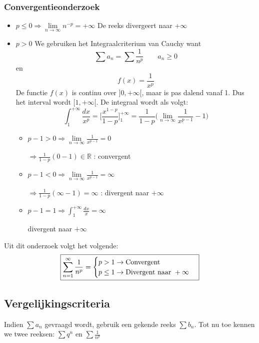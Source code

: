 \subsubsection{Convergentieonderzoek}
\begin{itemize}
	\item $p \leq 0 \Rightarrow \lim\limits_{n\to\infty} n^{-p} = +\infty$
	      De reeks divergeert naar $+\infty$
	\item $p > 0$
	      We gebruiken het Integraalcriterium van Cauchy want
	      $$\sum a_n = \sum \frac{1}{n^p} \qquad a_n \geq 0$$
	      en
	      $$f(x) = \frac{1}{x^p}$$
	      De functie $f(x)$ is continu over $]0, +\infty[$, maar is pas dalend vanaf 1. Dus het interval wordt $[1, +\infty[$. De integraal wordt als volgt:
	      $$\int_{1}^{+\infty} \frac{dx}{x^p} = \bigg[\frac{x^{1 - p}}{1 - p}\bigg]_1^{+\infty} = \frac{1}{1 - p}\bigg(\lim\limits_{n\to\infty}\frac{1}{x^{p-1}} - 1\bigg)$$
	      \begin{itemize}[label={als}]
		      \item $p - 1 > 0 \Rightarrow \lim\limits_{n\to\infty}\frac{1}{x^{p-1}} = 0$

		            $\Rightarrow \frac{1}{1 - p}(0 - 1) \in \mathbb{R}$ : convergent

		      \item $p - 1 < 0 \Rightarrow \lim\limits_{n\to\infty}\frac{1}{x^{p-1}} = \infty$

		            $\Rightarrow \frac{1}{1 - p}(\infty - 1) = \infty$ : divergent naar $+\infty$

		      \item $p - 1 = 1 \Rightarrow \int_1^{+\infty} \frac{dx}{x} = \infty$

		            divergent naar $+\infty$
	      \end{itemize}

\end{itemize}
Uit dit onderzoek volgt het volgende:
$$
	\boxed{
		\sum_{n = 1}^{\infty} \frac{1}{n^p} = \begin{cases}
			p > 1 \rightarrow \hbox{Convergent}                 \\
			p \leq 1 \rightarrow \hbox{Divergent naar } +\infty \\
		\end{cases}
	}
$$
\subsection{Vergelijkingscriteria}
Indien $\sum a_n$ gevraagd wordt, gebruik een gekende reeks $\sum b_n$. Tot nu toe kennen we twee reeksen: $\sum q^n$ en $\sum \frac{1}{n^p}$

